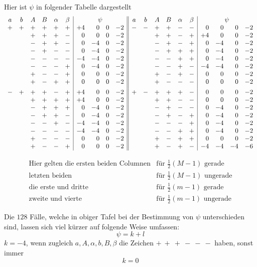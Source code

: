 Hier ist $\psi$ in folgender Tabelle dargestellt
\begingroup\small\setlength{\arraycolsep}{1.8pt}
\[
\begin{array}{cccccc|rrrr||cccccc|rrrr}
a&b&A&B&\alpha&\beta&\multicolumn{4}{c||}{\psi}&a&b&A&B&\alpha&\beta&\multicolumn{4}{c}{\psi}\\
+&+&+&+&+&+&+4&0&0&-2&-&-&+&+&-&-&0&0&0&-2\\
&&+&+&+&-&0&0&0&-2&&&+&+&-&+&+4&0&0&-2\\
&&-&+&+&-&0&-4&0&-2&&&-&+&-&+&0&-4&0&-2\\
&&-&+&-&-&0&-4&0&-2&&&-&+&+&+&0&-4&0&-2\\
&&-&-&-&-&-4&-4&0&-2&&&-&-&+&+&0&-4&0&-2\\
&&-&-&-&+&0&-4&0&-2&&&-&-&+&-&-4&-4&0&-2\\
&&+&-&-&+&0&0&0&-2&&&+&-&+&-&0&0&0&-2\\
&&+&-&+&+&0&0&0&-2&&&+&-&-&-&0&0&0&-2\\[4pt]
-&+&+&+&-&+&+4&0&0&-2&+&-&+&+&+&-&0&0&0&-2\\
&&+&+&+&+&+4&0&0&-2&&&+&+&-&-&0&0&0&-2\\
&&-&+&+&+&0&-4&0&-2&&&-&+&-&-&0&-4&0&-2\\
&&-&+&+&-&0&-4&0&-2&&&-&+&-&+&0&-4&0&-2\\
&&-&-&+&-&-4&-4&0&-2&&&-&-&-&+&0&-4&0&-2\\
&&-&-&-&-&-4&-4&0&-2&&&-&-&+&+&0&-4&0&-2\\
&&+&-&-&-&0&0&0&-2&&&+&-&+&+&0&0&0&-2\\
&&+&-&-&+&0&0&0&-2&&&+&-&+&-&-4&-4&-4&-6\\
\end{array}
\]
\endgroup

\[
\begin{array}{lll}
\text{Hier gelten die ersten beiden Columnen}&\text{für }\frac12(M-1)\text{ gerade}\\
\text{letzten beiden}&\text{für }\frac12(M-1)\text{ ungerade}\\
\text{die erste und dritte}&\text{für }\frac12(m-1)\text{ gerade}\\
\text{zweite und vierte}&\text{für }\frac12(m-1)\text{ ungerade}
\end{array}
\]

Die $128$ Fälle, welche in obiger Tafel bei der Bestimmung von $\psi$ unterschieden sind, lassen sich viel kürzer auf folgende Weise umfassen:
\[
\psi=k+l
\]
$k=-4$, wenn zugleich $a,A,\alpha,b,B,\beta$ die Zeichen $+\ +\ +\ -\ -\ -$ haben, sonst immer
\[
k=0
\]

